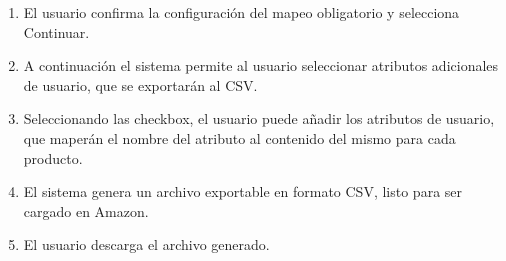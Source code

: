\begin{enumerate}
\begin{itemize}
    \end{itemize}
    \item El usuario confirma la configuración del mapeo obligatorio y selecciona Continuar.
    \item A continuación el sistema permite al usuario seleccionar atributos adicionales de usuario, que se exportarán al CSV.
    \item Seleccionando las checkbox, el usuario puede añadir los atributos de usuario, que maperán el nombre del atributo al contenido del mismo para cada producto.
    \item El sistema genera un archivo exportable en formato CSV, listo para ser cargado en Amazon.
    \item El usuario descarga el archivo generado.
\end{enumerate}

